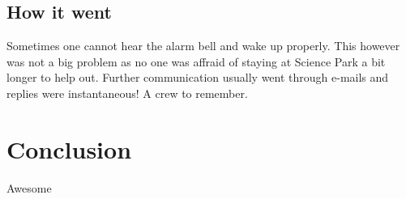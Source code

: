 \documentclass[a4paper]{article}
\begin{document}

\subsection{How it went}

Sometimes one cannot hear the alarm bell and wake up properly. This however was
not a big problem as no one was affraid of staying at Science Park a bit longer
to help out. Further communication usually went through e-mails and replies
were instantaneous! A crew to remember.

\section{Conclusion}

Awesome
\end{document}
